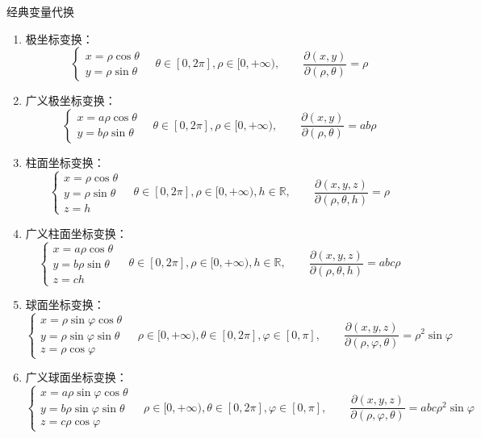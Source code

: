 \documentclass[lang = cn, scheme = chinese, thmcnt = section]{elegantbook}
\newcommand{\R}{\mathbb{R}}            %
\begin{document}
\begin{proposition}{经典变量代换}
	\begin{enumerate}
		\item 极坐标变换：
		$$
		\begin{cases}
			x=\rho\cos\theta\\
			y=\rho\sin\theta
		\end{cases}\quad \theta\in [0,2\pi],\rho\in[0,+\infty)
		,\qquad 
		\frac{\partial (x,y)}{\partial (\rho,\theta)}=\rho
		$$
		\item 广义极坐标变换：
		$$
		\begin{cases}
			x=a\rho\cos\theta\\
			y=b\rho\sin\theta
		\end{cases}\quad \theta\in [0,2\pi],\rho\in[0,+\infty)
		,\qquad 
		\frac{\partial (x,y)}{\partial (\rho,\theta)}=ab\rho
		$$
		\item 柱面坐标变换：
		$$
		\begin{cases}
			x=\rho\cos\theta\\
			y=\rho\sin\theta\\
			z=h
		\end{cases}\quad \theta\in [0,2\pi],\rho\in[0,+\infty),h\in\R
		,\qquad 
		\frac{\partial (x,y,z)}{\partial (\rho,\theta,h)}=\rho
		$$
		\item 广义柱面坐标变换：
		$$
		\begin{cases}
			x=a\rho\cos\theta\\
			y=b\rho\sin\theta\\
			z=ch
		\end{cases}\quad \theta\in [0,2\pi],\rho\in[0,+\infty),h\in\R
		,\qquad 
		\frac{\partial (x,y,z)}{\partial (\rho,\theta,h)}=abc\rho
		$$
		\item 球面坐标变换：
		$$
		\begin{cases}
			x=\rho\sin\varphi\cos\theta\\
			y=\rho\sin\varphi\sin\theta\\
			z=\rho\cos\varphi
		\end{cases}\quad \rho\in[0,+\infty),\theta\in [0,2\pi],\varphi\in [0,\pi]
		,\qquad 
		\frac{\partial (x,y,z)}{\partial (\rho,\varphi,\theta)}=\rho^2\sin\varphi
		$$
		\item 广义球面坐标变换：
		$$
		\begin{cases}
			x=a\rho\sin\varphi\cos\theta\\
			y=b\rho\sin\varphi\sin\theta\\
			z=c\rho\cos\varphi
		\end{cases}\quad \rho\in[0,+\infty),\theta\in [0,2\pi],\varphi\in [0,\pi]
		,\qquad 
		\frac{\partial (x,y,z)}{\partial (\rho,\varphi,\theta)}=abc\rho^2\sin\varphi
		$$
	\end{enumerate}
\end{proposition}
\end{document}
